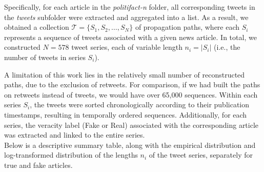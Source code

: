 \documentclass[a4paper,twoside,12pt]{book}
\begin{document}
Specifically, for each article in the \textit{politifact-n} folder, all corresponding tweets in the \textit{tweets} subfolder were extracted and aggregated into a list. As a result, we obtained a collection $\mathcal{T} = \{ S_1, S_2, \dots, S_N \}$ of propagation paths, where each $S_i$ represents a sequence of tweets associated with a given news article. In total, we constructed $N = 578$ tweet series, each of variable length $n_i = |S_i|$ (i.e., the number of tweets in series $S_i$).

A limitation of this work lies in the relatively small number of reconstructed paths, due to the exclusion of retweets. For comparison, if we had built the paths on retweets instead of tweets, we would have over 65,000 sequences. Within each series $S_i$, the tweets were sorted chronologically according to their publication timestamps, resulting in temporally ordered sequences. Additionally, for each series, the veracity label (Fake or Real) associated with the corresponding article was extracted and linked to the entire series.\\

Below is a descriptive summary table, along with the empirical distribution and log-transformed distribution of the lengths $n_i$ of the tweet series, separately for true and fake articles.
\end{document}

